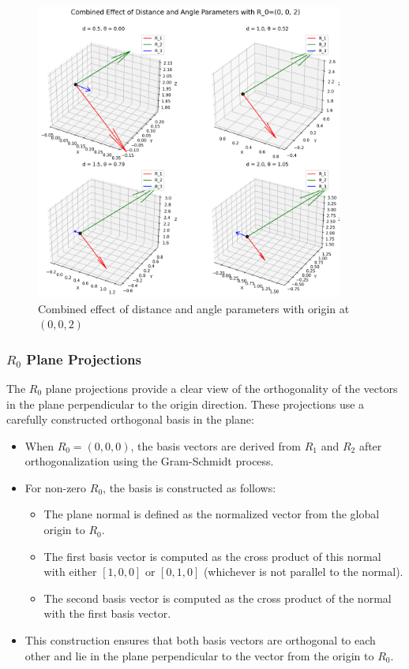 \begin{figure}[H]
    \centering
    \includegraphics[width=0.9\textwidth]{figures/combined_effect_R0_0_0_2.png}
    \caption{Combined effect of distance and angle parameters with origin at $(0,0,2)$}
    \label{fig:example_combined_effect_custom2}
\end{figure}

\subsubsection{$R_0$ Plane Projections}

The $R_0$ plane projections provide a clear view of the orthogonality of the vectors in the plane perpendicular to the origin direction. These projections use a carefully constructed orthogonal basis in the plane:

\begin{itemize}
    \item When $R_0 = (0,0,0)$, the basis vectors are derived from $R_1$ and $R_2$ after orthogonalization using the Gram-Schmidt process.
    \item For non-zero $R_0$, the basis is constructed as follows:
    \begin{itemize}
        \item The plane normal is defined as the normalized vector from the global origin to $R_0$.
        \item The first basis vector is computed as the cross product of this normal with either $[1,0,0]$ or $[0,1,0]$ (whichever is not parallel to the normal).
        \item The second basis vector is computed as the cross product of the normal with the first basis vector.
    \end{itemize}
    \item This construction ensures that both basis vectors are orthogonal to each other and lie in the plane perpendicular to the vector from the origin to $R_0$.
\end{itemize}

